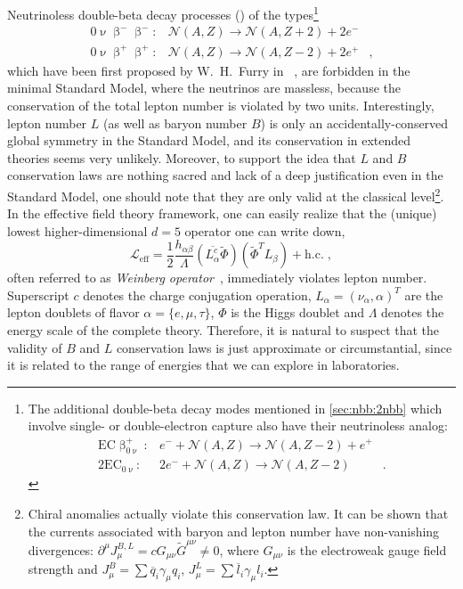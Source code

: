Neutrinoless double-beta decay processes (\onbb) of the types\footnote{%
  The additional double-beta decay modes mentioned in \cref{sec:nbb:2nbb} which involve
  single- or double-electron capture also have their neutrinoless analog:
  \[
    \begin{array}{lrl}
      \text{EC}\upbeta^+_{0\upnu}: &
        e^- + \mathcal{N}(A,Z) \rightarrow \mathcal{N}(A,Z-2) + e^+ & \\
      2\text{EC}_{0\upnu}: &
        2e^- + \mathcal{N}(A,Z) \rightarrow \mathcal{N}(A,Z-2) &.
    \end{array}
  \]
}
\[
  \begin{array}{lrl}
    0\upnu\upbeta^-\upbeta^-: &
      \mathcal{N}(A,Z) \longrightarrow \mathcal{N}(A,Z+2)+2e^- & \\
    0\upnu\upbeta^+\upbeta^+: &
      \mathcal{N}(A,Z) \longrightarrow \mathcal{N}(A,Z-2)+2e^+ &,
  \end{array}
\]
which have been first proposed by W.~H.~Furry in ~\cite{Furry1939}, are forbidden in
the minimal Standard Model, where the neutrinos are massless, because the conservation of
the total lepton number is violated by two units.  Interestingly, lepton number $L$ (as
well as baryon number $B$) is only an accidentally-conserved global symmetry in the
Standard Model, and its conservation in extended theories seems very unlikely. Moreover, to
support the idea that $L$ and $B$ conservation laws are nothing sacred and lack of a deep
justification even in the Standard Model, one should note that they are only valid at the
classical level\footnote{%
  Chiral anomalies actually violate this conservation law. It can be shown that the
  currents associated with baryon and lepton number have non-vanishing divergences:
  $\partial^\mu J_\mu^{B,L} = c G_{\mu\nu} \widetilde{G}^{\mu\nu} \neq 0$, where
  $G_{\mu\nu}$ is the electroweak gauge field strength and $J_\mu^B = \sum \overline{q}_i
  \gamma_\mu q_i$, $J_\mu^L = \sum \overline{l}_i \gamma_\mu l_i$.
}. In the effective field theory framework, one can easily realize that the (unique)
lowest higher-dimensional $d=5$ operator one can write down,
\[
  \mathcal{L}_\text{eff} = \frac{1}{2} \frac{h_{\alpha\beta}}{\Lambda}
                           (\overline{L_\alpha^c}\widetilde{\Phi})
                           (\widetilde{\Phi}^T L_\beta) + \text{h.c.} \;,
\]
often referred to as \emph{Weinberg operator}~\cite{Weinberg1979}, immediately violates lepton
number. Superscript $c$ denotes the charge conjugation operation, $L_\alpha =
(\nu_\alpha, \alpha)^T$ are the lepton doublets of flavor $\alpha = \{e, \mu, \tau\}$, $\Phi$
is the Higgs doublet and $\Lambda$ denotes the energy scale of the complete theory.
Therefore, it is natural to suspect that the validity of $B$ and $L$ conservation laws is
just approximate or circumstantial, since it is related to the range of energies that we
can explore in laboratories.

